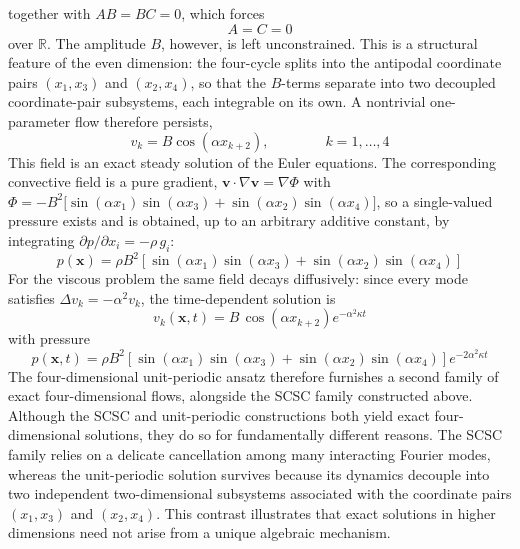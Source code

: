 \documentclass[11pt]{jfm}
\numberwithin{equation}{section}
\begin{document}
together with $AB = BC = 0$, which forces
\begin{equation}
\label{4.14}
A = C = 0
\end{equation}
over $\mathbb{R}$. The amplitude $B$, however, is left unconstrained. This is a structural
feature of the even dimension: the four-cycle splits into the antipodal coordinate pairs
$(x_1,x_3)$ and $(x_2,x_4)$, so that the $B$-terms separate into two decoupled
coordinate-pair subsystems, each integrable on its own. A nontrivial one-parameter flow therefore
persists,
\begin{equation}
\label{4.15}
v_k = B\cos(\alpha x_{k+2}), \qquad\qquad k=1,\dots,4
\end{equation}
This field is an exact steady solution of the Euler equations. The corresponding convective field is a pure gradient, $\boldsymbol{v}\cdot\nabla\boldsymbol{v} = \nabla\Phi$ with
$\Phi = -B^2\bigl[\sin(\alpha x_1)\sin(\alpha x_3)
+ \sin(\alpha x_2)\sin(\alpha x_4)\bigr]$,
so a single-valued pressure exists and is obtained, up to an arbitrary additive constant, by integrating
$\partial p/\partial x_i = -\rho\, g_i$:
\begin{equation}
\label{4.16}
p(\boldsymbol{x}) = \rho B^2\!\left[\sin(\alpha x_1)\sin(\alpha x_3)
+ \sin(\alpha x_2)\sin(\alpha x_4)\right]
\end{equation}
For the viscous problem the same field decays diffusively: since every mode satisfies
$\Delta v_k = -\alpha^2 v_k$, the time-dependent solution is
\begin{equation}
\label{4.17}
v_k(\boldsymbol{x},t) = B\,\cos(\alpha x_{k+2})e^{-\alpha^2\kappa t}
\end{equation}
with pressure
\begin{equation}
\label{4.18}
p(\boldsymbol{x},t) = \rho B^2 \!\left[\sin(\alpha x_1)\sin(\alpha x_3)
+ \sin(\alpha x_2)\sin(\alpha x_4)\right]e^{-2\alpha^2\kappa t}
\end{equation}
The four-dimensional unit-periodic ansatz therefore furnishes a second family of
exact four-dimensional flows, alongside the SCSC family constructed above. Although the SCSC and
unit-periodic constructions both yield exact four-dimensional solutions, they do so for
fundamentally different reasons. The SCSC family
relies on a delicate cancellation among many interacting Fourier modes,
whereas the unit-periodic solution survives because its dynamics decouple into two
independent two-dimensional subsystems associated with the coordinate pairs
$(x_1,x_3)$ and $(x_2,x_4)$. This contrast illustrates that exact solutions
in higher dimensions need not arise from a unique algebraic mechanism.
\end{document}
